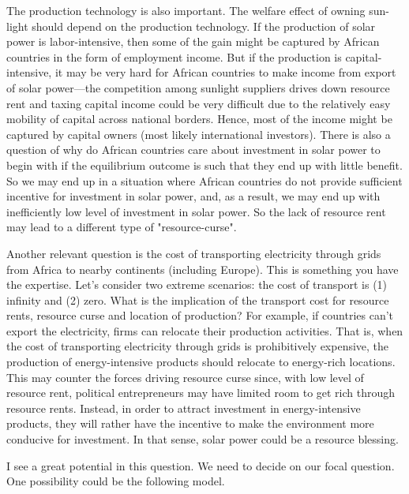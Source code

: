 \documentclass[12pt]{article}%
\begin{document}
\begin{itemize}
The production technology is also important. The welfare effect of owning sun-light should depend on the production technology. If the production of solar power is labor-intensive, then some of the gain might be captured by African countries in the form of employment income. But if the production is capital-intensive, it may be very hard for African countries to make income from export of solar power---the competition among sunlight suppliers drives down resource rent and taxing capital income could be very difficult due to the relatively easy mobility of capital across national borders. Hence, most of the income might be captured by capital owners (most likely international investors). There is also a question of why do African countries care about investment in solar power to begin with if the equilibrium outcome is such that they end up with little benefit. So we may end up in a situation where African countries do not provide sufficient incentive for investment in solar power, and, as a result, we may end up with inefficiently low level of investment in solar power. So the lack of resource rent may lead to a different type of "resource-curse".

Another relevant question is the cost of transporting electricity through grids from Africa to nearby continents (including Europe). This is something you have the expertise. Let's consider two extreme scenarios: the cost of transport is  (1) infinity and (2) zero. What is the implication of the transport cost for resource rents, resource curse and location of production? For example, if countries can't export the electricity, firms can relocate their production activities. That is, when the cost of transporting electricity through grids is prohibitively expensive, the production of energy-intensive products should relocate to energy-rich locations. This may counter the forces driving resource curse since, with low level of resource rent, political entrepreneurs  may have limited room to get rich through resource rents. Instead, in order to attract investment in energy-intensive products, they will rather have the incentive to make the environment more conducive for investment.  In that sense, solar power could be a resource blessing.

I see a great potential in this question. We need to decide on our focal question. One possibility could be the following model.


\end{itemize}
\end{document}
